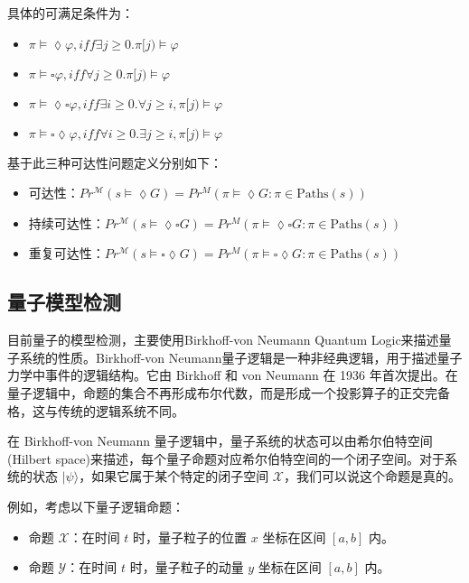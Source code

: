 具体的可满足条件为：
\begin{itemize}
    \item \(\pi\models\lozenge\varphi,iff\exists j\ge0.\pi[j)\models\varphi\)
    \item \(\pi\models\square\varphi,iff\forall j\ge 0.\pi[j)\models\varphi\)
    \item \(\pi\models\lozenge\square\varphi,iff\exists i\ge 0.\forall j\ge i,\pi[j)\models\varphi\)
    \item \(\pi\models\square\lozenge\varphi,iff\forall i\ge 0.\exists j\ge i,\pi[j)\models\varphi\)
\end{itemize}
基于此三种可达性问题定义分别如下：
\begin{itemize}
    \item 可达性：\( Pr^{\mathcal{M}}(s \models \lozenge G) = Pr^M(\pi \models \lozenge G : \pi \in \text{Paths}(s))\)
    \item 持续可达性：\( Pr^{\mathcal{M}}(s \models \lozenge \square G) = Pr^M(\pi \models \lozenge \square G : \pi \in \text{Paths}(s))\)
    \item 重复可达性：\( Pr^{\mathcal{M}}(s \models\square \lozenge G) = Pr^M(\pi \models \square\lozenge G : \pi \in \text{Paths}(s))\)
\end{itemize}
\subsection{量子模型检测}
目前量子的模型检测，主要使用Birkhoff-von Neumann Quantum Logic来描述量子系统的性质\citep{birkhoff1987logic}。Birkhoff-von Neumann量子逻辑是一种非经典逻辑，用于描述量子力学中事件的逻辑结构。它由 Birkhoff 和 von Neumann 在 1936 年首次提出。在量子逻辑中，命题的集合不再形成布尔代数，而是形成一个投影算子的正交完备格，这与传统的逻辑系统不同。

在 Birkhoff-von Neumann 量子逻辑中，量子系统的状态可以由希尔伯特空间(Hilbert space)来描述，每个量子命题对应希尔伯特空间的一个闭子空间。对于系统的状态 \(|\psi\rangle\)，如果它属于某个特定的闭子空间 \( \mathcal{X} \)，我们可以说这个命题是真的。

例如，考虑以下量子逻辑命题：

\begin{itemize}
\item 命题 \( \mathcal{X} \)：在时间 \( t \) 时，量子粒子的位置 \( x \) 坐标在区间 \( [a, b] \) 内。
\item 命题 \( \mathcal{Y} \)：在时间 \( t \) 时，量子粒子的动量 \( y \) 坐标在区间 \( [a, b] \) 内。
\end{itemize}

